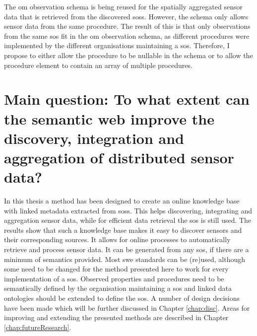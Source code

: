 The \ac{om} observation schema is being reused for the spatially aggregated sensor data that is retrieved from the discovered \aclp{sos}. However, the schema only allows sensor data from the same procedure. The result of this is that only observations from the same \ac{sos} fit in the \ac{om} observation schema, as different procedures were implemented by the different organisations maintaining a \ac{sos}. Therefore, I propose to either allow the procedure to be nullable in the schema or to allow the procedure element to contain an array of multiple procedures.  


\section*{\textbf{Main question:} To what extent can the semantic web improve the discovery, integration and aggregation of distributed sensor data?}%

In this thesis a method has been designed to create an online knowledge base with linked metadata extracted from \aclp{sos}. This helps discovering, integrating and aggregation sensor data, while for efficient data retrieval the \ac{sos} is still used. The results show that such a knowledge base makes it easy to discover sensors and their corresponding sources. It allows for online processes to automatically retrieve and process sensor data. It can be generated from any \ac{sos}, if there are a minimum of semantics provided. Most \ac{swe} standards can be (re)used, although some need to be changed for the method presented here to work for every implementation of a \ac{sos}. Observed properties and procedures need to be semantically defined by the organisation maintaining a \ac{sos} and linked data ontologies should be extended to define the \acl{sos}. A number of design decisions have been made which will be further discussed in Chapter \ref{chap:disc}. Areas for improving and extending the presented methods are described in Chapter \ref{chap:futureResearch}.
